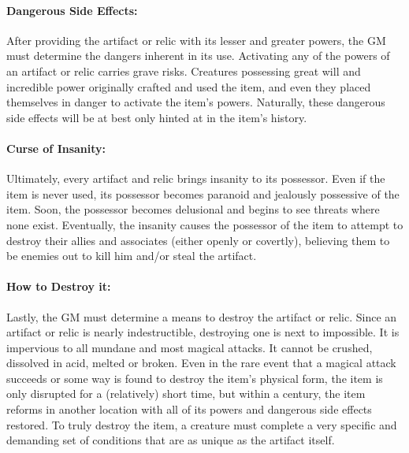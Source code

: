 \begin{multicols}{2}
\paragraph{Dangerous Side Effects:} After providing the artifact or relic with its lesser and greater powers, the GM must determine the dangers inherent in its use.  Activating any of the powers of an artifact or relic carries grave risks.  Creatures possessing great will and incredible power originally crafted and used the item, and even they placed themselves in danger to activate the item's powers.  Naturally, these dangerous side effects will be at best only hinted at in the item's history.  

\paragraph{Curse of Insanity:} Ultimately, every artifact and relic brings insanity to its possessor.  Even if the item is never used, its possessor becomes paranoid and jealously possessive of the item.  Soon, the possessor becomes delusional and begins to see threats where none exist.  Eventually, the insanity causes the possessor of the item to attempt to destroy their allies and associates (either openly or covertly), believing them to be enemies out to kill him and/or steal the artifact.

\paragraph{How to Destroy it:} Lastly, the GM must determine a means to destroy the artifact or relic.  Since an artifact or relic is nearly indestructible, destroying one is next to impossible.  It is impervious to all mundane and most magical attacks.  It cannot be crushed, dissolved in acid, melted or broken.  Even in the rare event that a magical attack succeeds or some way is found to destroy the item's physical form, the item is only disrupted for a (relatively) short time, but within a century, the item reforms in another location with all of its powers and dangerous side effects restored.  To truly destroy the item, a creature must complete a very specific and demanding set of conditions that are as unique as the artifact itself.

\end{multicols}



